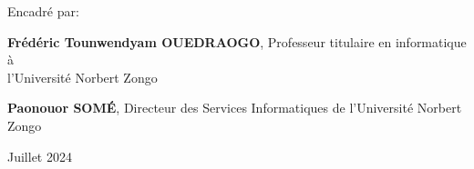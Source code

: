 \begin{titlepage}
\begin{center}
\end{center}

\vspace{30pt}
{\fontsize{16}{1}\selectfont Encadré par:}\\
\vspace{2pt}

{\fontsize{14}{1}\selectfont \textbf{Frédéric Tounwendyam OUEDRAOGO}}, Professeur titulaire en informatique à\\ \hspace*{260pt} l'Université Norbert Zongo\\
\vspace{2pt}

{\fontsize{14}{1}\selectfont \textbf{Paonouor SOMÉ}}, Directeur des Services Informatiques de l'Université Norbert Zongo\\ 

\vspace{25pt}

\begin{center}
Juillet 2024
\end{center}
\end{titlepage}
